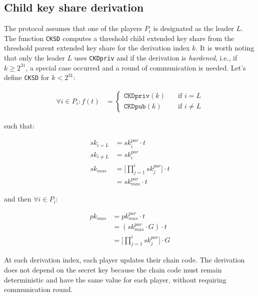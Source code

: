 \subsection{Child key share derivation}

The protocol assumes that one of the players $P_i$ is designated as the leader
$L$. The function \texttt{CKSD} computes a threshold child extended key share
from the threshold parent extended key share for the derivation index $k$. It is
worth noting that only the leader $L$ uses \texttt{CKDpriv} and if the derivation
is \textit{hardened}, i.e., if $k \geq 2^{31}$, a special case occurred and a
round of communication is needed. Let's define \texttt{CKSD} for $k < 2^{31}$:

\begin{equation}
\begin{split}
  \forall i \in P_i : f(t) &=
  \begin{cases}
    \texttt{CKDpriv}(k) & \quad \text{if } i = L\\%
    \texttt{CKDpub}(k) & \quad \text{if } i \neq L
  \end{cases}
\end{split}
\end{equation}

such that:

\begin{equation}
\begin{split}
  sk_{i = L} &= sk_{i}^{par} \cdot t \\
  sk_{i \neq L} &= sk_{i}^{par} \\
  sk_{mas} &= \Bigg[ \prod_{j=1}^{i} sk_{j}^{par} \Bigg] \cdot t \\
       &= sk_{mas}^{par} \cdot t
\end{split}
\end{equation}

and then $\forall i \in P_i$:

\begin{equation}
\begin{split}
  pk_{mas} &= pk_{mas}^{par} \cdot t \\
       &= (sk_{mas}^{par} \cdot G) \cdot t \\
       &= \Bigg[ \prod_{j=1}^{i} sk_{j}^{par} \Bigg] \cdot G
\end{split}
\end{equation}

At each derivation index, each player updates their chain code. The derivation
does not depend on the secret key because the chain code must remain
deterministic and have the same value for each player, without requiring
communication round.

